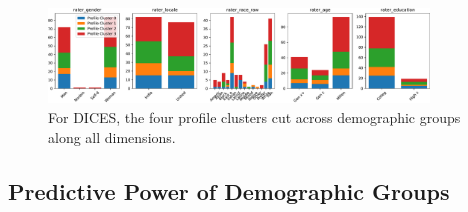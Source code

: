 \documentclass[11pt]{article}
\begin{document}
\begin{figure}[h]
\centering
\includegraphics[width=0.9\textwidth]{files/dices_dem.pdf}
\caption{For DICES, the four profile clusters cut across demographic groups along all dimensions.}
\label{fig:dicesdem}
\end{figure}


\subsection{Predictive Power of Demographic Groups}
\end{document}
